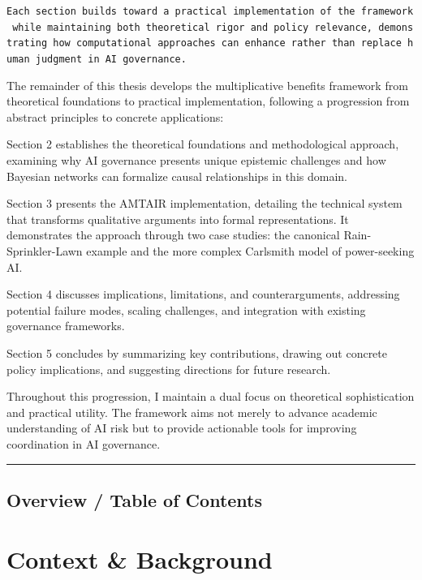\documentclass[
  11pt,
  letterpaper,
]{book}
\begin{document}
\texttt{Each\ section\ builds\ toward\ a\ practical\ implementation\ of\ the\ framework\ while\ maintaining\ both\ theoretical\ rigor\ and\ policy\ relevance,\ demonstrating\ how\ computational\ approaches\ can\ enhance\ rather\ than\ replace\ human\ judgment\ in\ AI\ governance.}

The remainder of this thesis develops the multiplicative benefits
framework from theoretical foundations to practical implementation,
following a progression from abstract principles to concrete
applications:

Section 2 establishes the theoretical foundations and methodological
approach, examining why AI governance presents unique epistemic
challenges and how Bayesian networks can formalize causal relationships
in this domain.

Section 3 presents the AMTAIR implementation, detailing the technical
system that transforms qualitative arguments into formal
representations. It demonstrates the approach through two case studies:
the canonical Rain-Sprinkler-Lawn example and the more complex Carlsmith
model of power-seeking AI.

Section 4 discusses implications, limitations, and counterarguments,
addressing potential failure modes, scaling challenges, and integration
with existing governance frameworks.

Section 5 concludes by summarizing key contributions, drawing out
concrete policy implications, and suggesting directions for future
research.

Throughout this progression, I maintain a dual focus on theoretical
sophistication and practical utility. The framework aims not merely to
advance academic understanding of AI risk but to provide actionable
tools for improving coordination in AI governance.

\begin{center}\rule{0.5\linewidth}{0.5pt}\end{center}

\section{Overview / Table of Contents}\label{overview-table-of-contents}


\chapter{Context \& Background}\label{sec-context}
\end{document}
